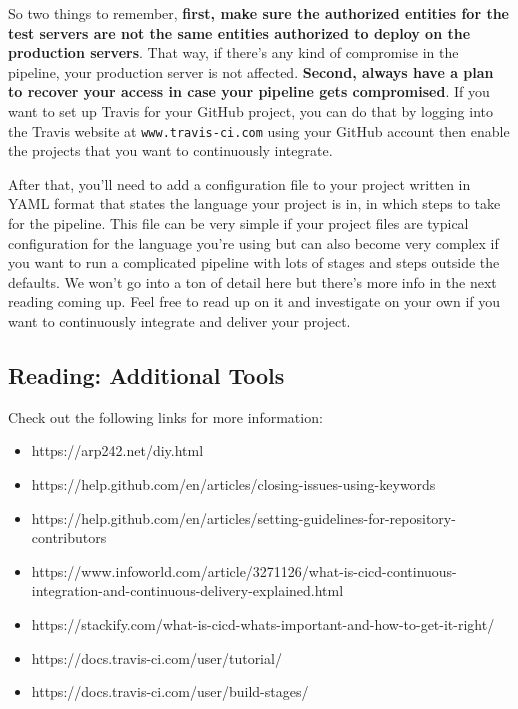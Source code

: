 	So two things to remember, \textbf{first, make sure the authorized entities for the test servers are not the same entities authorized to deploy on the production servers}. That way, if there's any kind of compromise in the pipeline, your production server is not affected.
	\textbf{Second, always have a plan to recover your access in case your pipeline gets compromised}. If you want to set up Travis for your GitHub project, you can do that by logging into the Travis website at \verb|www.travis-ci.com| using your GitHub account then enable the projects that you want to continuously integrate. 
	
	After that, you'll need to add a configuration file to your project written in YAML format that states the language your project is in, in which steps to take for the pipeline. This file can be very simple if your project files are typical configuration for the language you're using but can also become very complex if you want to run a complicated pipeline with lots of stages and steps outside the defaults. We won't go into a ton of detail here but there's more info in the next reading coming up. Feel free to read up on it and investigate on your own if you want to continuously integrate and deliver your project.
	
	\subsection{Reading: Additional Tools}
	
	Check out the following links for more information:
	
	\begin{itemize}
		
\item https://arp242.net/diy.html 
	
\item https://help.github.com/en/articles/closing-issues-using-keywords
	
\item https://help.github.com/en/articles/setting-guidelines-for-repository-contributors 
	
\item https://www.infoworld.com/article/3271126/what-is-cicd-continuous-integration-and-continuous-delivery-explained.html
	
\item https://stackify.com/what-is-cicd-whats-important-and-how-to-get-it-right/
	
\item https://docs.travis-ci.com/user/tutorial/
	
\item https://docs.travis-ci.com/user/build-stages/
	
	\end{itemize}

